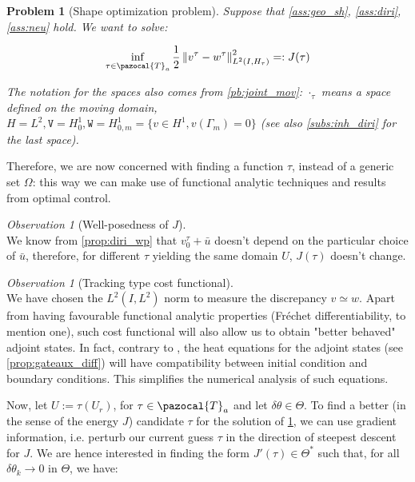 \documentclass[english,a4paper,9pt,oneside]{scrbook}	%
\theoremstyle{break}
\newtheorem{pb}[equation]{Problem}
\theoremstyle{remark}
\newtheorem{obs}[equation]{Observation}
\newcommand{\norm}[1]{\left\lVert#1\right\rVert}
\newcommand{\cT}{\pazocal{T}}
\newcommand{\te}{\theta}
\newcommand{\Te}{\Theta}
\newcommand{\tw}[1]{\texttt{#1}}
\begin{document}
\begin{pb}[Shape optimization problem]
\label{pb:shopt}
Suppose that \cref{ass:geo_sh}, \cref{ass:diri}, \cref{ass:neu} hold. We want to solve:

$$\inf_{\tau \in \cT_a}\frac{1}{2}\norm{v^\tau-w^\tau}_{L^2(I,H_\tau)}^2=:J(\tau)$$

The notation for the spaces also comes from  \cref{pb:joint_mov}: $\cdot_\tau$ means a space defined on the moving domain, $H=L^2, \tw{V}=H^1_0, \tw{W} = H^1_{0,m}=\{v \in H^1, v(\Gamma_m)=0\}$ (see also \cref{subs:inh_diri} for the last space).

\end{pb}

Therefore, we are now concerned with finding a function $\tau$, instead of a generic set $\Omega$: this way we can make use of functional analytic techniques and results from optimal control.

\begin{obs}[Well-posedness of $J$]
\mbox{}\\
We know from \cref{prop:diri_wp} that $v_0^\tau + \bar{u}$ doesn't depend on the particular choice of $\bar{u}$, therefore, for different $\tau$ yielding the same domain $U$, $J(\tau)$ doesn't change.

\end{obs}

\begin{obs}[Tracking type cost functional]
\mbox{}\\
We have chosen the $L^2(I,L^2)$ norm to measure the discrepancy $v\simeq w$. Apart from having favourable functional analytic properties (Fréchet differentiability, to mention one), such cost functional will also allow us to obtain "better behaved" adjoint states. In fact, contrary to \cite{harbrecht}, the heat equations for the adjoint states (see \cref{prop:gateaux_diff}) will have compatibility between initial condition and boundary conditions. This simplifies the numerical analysis of such equations.
\end{obs}


Now, let $U:=\tau(U_r)$, for $\tau \in \cT_a$ and let $\delta \te \in \Te$. To find a better (in the sense of the energy $J$) candidate $\tau$ for the solution of \cref{pb:shopt}, we can use gradient information, i.e. perturb our current guess $\tau$ in the direction of steepest descent for $J$. We are hence interested in finding the form $J'(\tau) \in \Te^*$ such that, for all $\delta \te_k \rightarrow 0$ in $\Te$, we have:
\end{document}
